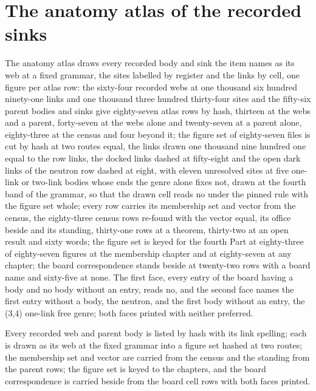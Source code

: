 \section{The anatomy atlas of the recorded sinks}\label{mod:IV-8e-D543430-the-anatomy-atlas-of-the-landed-sinks}
\begin{chtable}
The anatomy atlas draws every recorded body and sink the item names as its web at a fixed grammar, the sites labelled by register and the links by cell, one figure per atlas row: the sixty-four recorded webs at one thousand six hundred ninety-one links and one thousand three hundred thirty-four sites and the fifty-six parent bodies and sinks give eighty-seven atlas rows by hash, thirteen at the webs and a parent, forty-seven at the webs alone and twenty-seven at a parent alone, eighty-three at the census and four beyond it; the figure set of eighty-seven files is cut by hash at two routes equal, the links drawn one thousand nine hundred one equal to the row links, the docked links dashed at fifty-eight and the open dark links of the neutron row dashed at eight, with eleven unresolved sites at five one-link or two-link bodies whose ends the genre alone fixes not, drawn at the fourth band of the grammar, so that the drawn cell reads no under the pinned rule with the figure set whole; every row carries its membership set and vector from the census, the eighty-three census rows re-found with the vector equal, its office beside and its standing, thirty-one rows at a theorem, thirty-two at an open result and sixty words; the figure set is keyed for the fourth Part at eighty-three of eighty-seven figures at the membership chapter and at eighty-seven at any chapter; the board correspondence stands beside at twenty-two rows with a board name and sixty-five at none. The first face, every entry of the board having a body and no body without an entry, reads no, and the second face names the first entry without a body, the neutron, and the first body without an entry, the (3,4) one-link free genre; both faces printed with neither preferred.
\end{chtable}
\chdeps{}{}
Every recorded web and parent body is listed by hash with its link spelling; each is drawn as its web at the fixed grammar into a figure set hashed at two routes; the membership set and vector are carried from the census and the standing from the parent rows; the figure set is keyed to the chapters, and the board correspondence is carried beside from the board cell rows with both faces printed.


